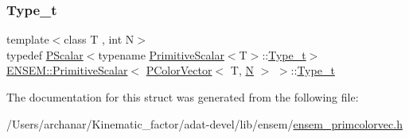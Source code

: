 \mbox{\label{structENSEM_1_1PrimitiveScalar_3_01PColorVector_3_01T_00_01N_01_4_01_4_accc4860e90963b3b1cf8d72a9a4a7163}} 
\subsubsection{\texorpdfstring{Type\_t}{Type\_t}\hspace{0.1cm}{\footnotesize\ttfamily [3/3]}}
{\footnotesize\ttfamily template$<$class T , int N$>$ \\
typedef \mbox{\hyperlink{classENSEM_1_1PScalar}{P\+Scalar}}$<$typename \mbox{\hyperlink{structENSEM_1_1PrimitiveScalar}{Primitive\+Scalar}}$<$T$>$\+::\mbox{\hyperlink{structENSEM_1_1PrimitiveScalar_3_01PColorVector_3_01T_00_01N_01_4_01_4_accc4860e90963b3b1cf8d72a9a4a7163}{Type\+\_\+t}}$>$ \mbox{\hyperlink{structENSEM_1_1PrimitiveScalar}{E\+N\+S\+E\+M\+::\+Primitive\+Scalar}}$<$ \mbox{\hyperlink{classENSEM_1_1PColorVector}{P\+Color\+Vector}}$<$ T, \mbox{\hyperlink{adat__devel_2lib_2hadron_2operator__name__util_8cc_a7722c8ecbb62d99aee7ce68b1752f337}{N}} $>$ $>$\+::\mbox{\hyperlink{structENSEM_1_1PrimitiveScalar_3_01PColorVector_3_01T_00_01N_01_4_01_4_accc4860e90963b3b1cf8d72a9a4a7163}{Type\+\_\+t}}}



The documentation for this struct was generated from the following file\+:\begin{DoxyCompactItemize}
\item 
/\+Users/archanar/\+Kinematic\+\_\+factor/adat-\/devel/lib/ensem/\mbox{\hyperlink{adat-devel_2lib_2ensem_2ensem__primcolorvec_8h}{ensem\+\_\+primcolorvec.\+h}}\end{DoxyCompactItemize}
